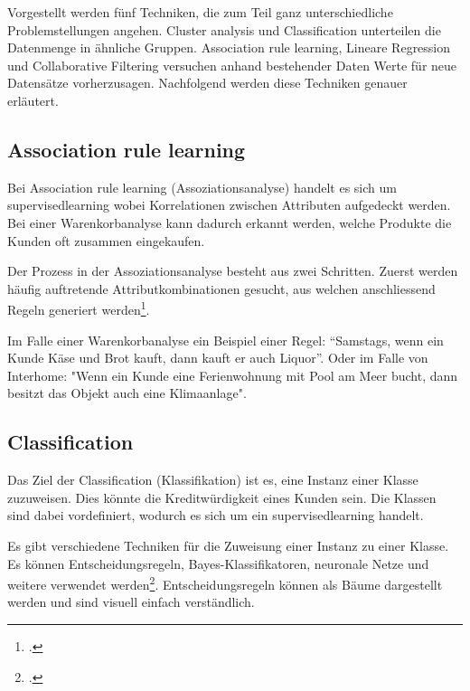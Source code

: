 Vorgestellt werden fünf Techniken, die zum Teil ganz unterschiedliche Problemstellungen angehen. Cluster analysis und Classification unterteilen die Datenmenge in ähnliche Gruppen. Association rule learning, Lineare Regression und Collaborative Filtering versuchen anhand bestehender Daten Werte für neue Datensätze vorherzusagen. Nachfolgend werden diese Techniken genauer erläutert.

\subsection{Association rule learning}
\label{sec:recherche:dataminingtechniken:disziplinen:association}
Bei Association rule learning (Assoziationsanalyse) handelt es sich um \gls{supervisedlearning} wobei Korrelationen zwischen Attributen aufgedeckt werden. Bei einer Warenkorbanalyse kann dadurch erkannt werden, welche Produkte die Kunden oft zusammen eingekaufen.

Der Prozess in der Assoziationsanalyse besteht aus zwei Schritten. Zuerst werden häufig auftretende Attributkombinationen gesucht, aus welchen anschliessend Regeln generiert werden\footcite{association_rule_learning_2017-01-05}.

Im Falle einer Warenkorbanalyse ein Beispiel einer Regel: "`Samstags, wenn ein Kunde Käse und Brot kauft, dann kauft er auch Liquor"'. Oder im Falle von Interhome: "Wenn ein Kunde eine Ferienwohnung mit Pool am Meer bucht, dann besitzt das Objekt auch eine Klimaanlage".

\subsection{Classification}
\label{sec:recherche:dataminingtechniken:disziplinen:classification}
Das Ziel der Classification (Klassifikation) ist es, eine Instanz einer Klasse zuzuweisen. Dies könnte die Kreditwürdigkeit eines Kunden sein. Die Klassen sind dabei vordefiniert, wodurch es sich um ein \gls{supervisedlearning} handelt.

Es gibt verschiedene Techniken für die Zuweisung einer Instanz zu einer Klasse. Es können Entscheidungsregeln, Bayes-Klassifikatoren, neuronale Netze und weitere verwendet werden\footcite{comparision_classification_algorithms}. Entscheidungsregeln können als Bäume dargestellt werden und sind visuell einfach verständlich.

